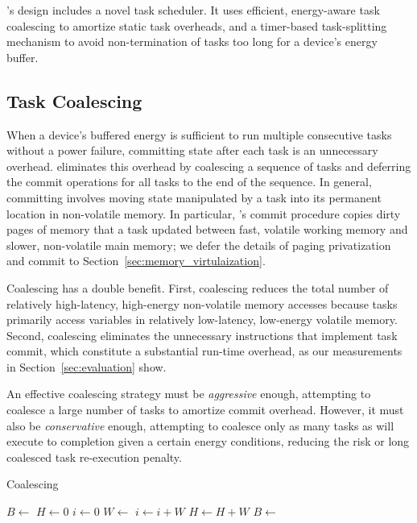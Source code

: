 \sys's design includes a novel task scheduler. It uses efficient, energy-aware task coalescing to amortize static task overheads, and a timer-based task-splitting mechanism to avoid non-termination of tasks too long for a device's energy buffer. 

\subsection{Task Coalescing}
\label{sec:task_coalescing}

When a device's buffered energy is sufficient to run multiple consecutive tasks without a power failure, committing state after each task is an unnecessary overhead. \sys eliminates this overhead by coalescing a sequence of tasks and deferring the commit
operations for all tasks to the end of the sequence. In general, committing involves moving state manipulated by a task into its permanent location in non-volatile memory. In particular, \sys's commit procedure copies dirty pages of memory that a task updated between fast, volatile working memory and slower, non-volatile main memory; we defer the details of paging privatization and commit to Section~\ref{sec:memory_virtulaization}.

Coalescing has a double benefit. First, coalescing reduces the total number of relatively high-latency, high-energy non-volatile memory accesses because tasks primarily access variables in relatively low-latency, low-energy volatile memory. Second, coalescing eliminates the unnecessary instructions that implement task commit, which constitute a substantial run-time overhead, as our measurements in Section~\ref{sec:evaluation} show.

An effective coalescing strategy must be {\em aggressive} enough, attempting to coalesce a large number of tasks to amortize commit overhead. However, it must also be  {\em conservative} enough, attempting to coalesce only as many tasks as will execute to completion given a certain energy conditions, reducing the risk or long coalesced task re-execution penalty. 

\begin{algorithm}[t]
	\caption{Coalescing}
	\label{algo:genCoalescing}
	\scriptsize
	\begin{algorithmic}[1]
        \State $B \leftarrow $ 
        \State $H \gets 0$ 
	        \State $ i \gets 0$
		        \State {}
		        \State $W \leftarrow $ 
		        \State $i \gets i + W$
				\State $H \gets H + W$
	        \EndWhile
	        \State {}
	        \State $B \leftarrow $ 
        \EndWhile
	\end{algorithmic}
\end{algorithm}
% 
